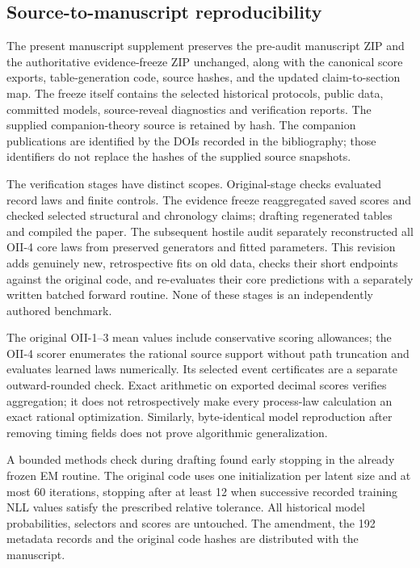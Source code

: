 \subsection{Source-to-manuscript reproducibility}\label{p3:c22}
The present manuscript supplement preserves the pre-audit manuscript ZIP and the authoritative evidence-freeze ZIP unchanged, along with the canonical score exports, table-generation code, source hashes, and the updated claim-to-section map. The freeze itself contains the selected historical protocols, public data, committed models, source-reveal diagnostics and verification reports. The supplied companion-theory source is retained by hash. The companion publications are identified by the DOIs recorded in the bibliography; those identifiers do not replace the hashes of the supplied source snapshots.

The verification stages have distinct scopes. Original-stage checks evaluated record laws and finite controls. The evidence freeze reaggregated saved scores and checked selected structural and chronology claims; drafting regenerated tables and compiled the paper. The subsequent hostile audit separately reconstructed all OII-4 core laws from preserved generators and fitted parameters. This revision adds genuinely new, retrospective fits on old data, checks their short endpoints against the original code, and re-evaluates their core predictions with a separately written batched forward routine. None of these stages is an independently authored benchmark.

The original OII-1--3 mean values include conservative scoring allowances; the OII-4 scorer enumerates the rational source support without path truncation and evaluates learned laws numerically. Its selected event certificates are a separate outward-rounded check. Exact arithmetic on exported decimal scores verifies aggregation; it does not retrospectively make every process-law calculation an exact rational optimization. Similarly, byte-identical model reproduction after removing timing fields does not prove algorithmic generalization.

A bounded methods check during drafting found early stopping in the already frozen EM routine. The original code uses one initialization per latent size and at most 60 iterations, stopping after at least 12 when successive recorded training NLL values satisfy the prescribed relative tolerance. All historical model probabilities, selectors and scores are untouched. The amendment, the 192 metadata records and the original code hashes are distributed with the manuscript.

